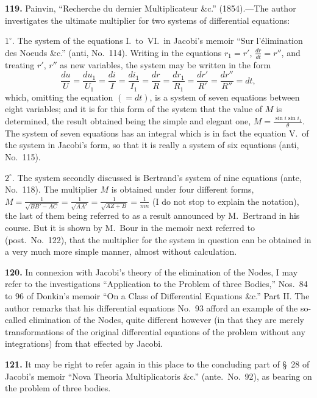 \documentclass[11pt,a4paper]{book}
\begin{document}
\textbf{119.} Painvin, ``Recherche du dernier Multiplicateur \&c.'' (1854).---The author investigates the ultimate multiplier for two systems of differential equations:

$1^\circ$. The system of the equations I.~to~VI.\ in Jacobi's memoir ``Sur l'\'elimination des Noeuds \&c.'' (anti, No.~114). Writing in the equations $r_1 = r'$, $\frac{dr}{dt} = r''$, and treating $r'$, $r''$ as new variables, the system may be written in the form
\[
\frac{du}{U} = \frac{du_1}{U_1} = \frac{di}{I} = \frac{di_1}{I_1} = \frac{dr}{R} = \frac{dr_1}{R_1} = \frac{dr'}{R'} = \frac{dr''}{R''} = dt,
\]
which, omitting the equation $(=dt)$, is a system of seven equations between eight variables; and it is for this form of the system that the value of $M$ is determined, the result obtained being the simple and elegant one, $M = \frac{\sin i \sin i_1}{\theta}$. The system of seven equations has an integral which is in fact the equation V.\ of the system in Jacobi's form, so that it is really a system of six equations (anti, No.~115).

$2^\circ$. The system secondly discussed is Bertrand's system of nine equations (ante, No.~118). The multiplier $M$ is obtained under four different forms, $M = \frac{1}{\sqrt{BB' - AC}} = \frac{1}{\sqrt{AA'}} = \frac{1}{\sqrt{AZ + B}} = \frac{1}{mn}$ (I do not stop to explain the notation), the last of them being referred to as a result announced by M.~Bertrand in his course. But it is shown by M.~Bour in the memoir next referred to (post.\ No.~122), that the multiplier for the system in question can be obtained in a very much more simple manner, almost without calculation.

\textbf{120.} In connexion with Jacobi's theory of the elimination of the Nodes, I may refer to the investigations ``Application to the Problem of three Bodies,'' Nos.~84 to 96 of Donkin's memoir ``On a Class of Differential Equations \&c.'' Part II. The author remarks that his differential equations No.~93 afford an example of the so-called elimination of the Nodes, quite different however (in that they are merely transformations of the original differential equations of the problem without any integrations) from that effected by Jacobi.

\textbf{121.} It may be right to refer again in this place to the concluding part of \S~28 of Jacobi's memoir ``Nova Theoria Multiplicatoris \&c.'' (ante.\ No.~92), as bearing on the problem of three bodies.
\end{document}
